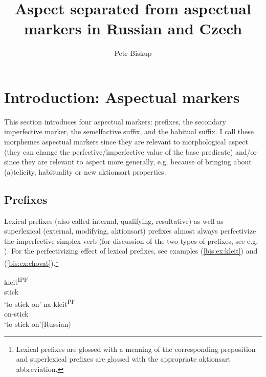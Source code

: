 \documentclass[output=paper]{langscibook}
\author{Petr Biskup\affiliation{Universität Leipzig}\orcid{0000-0003-2602-8856}}
\title{Aspect separated from aspectual markers in Russian and Czech}
\begin{document}
\maketitle

% 

\section{Introduction: Aspectual markers}\label{bis:sec:intro}

This section introduces four aspectual markers: prefixes, the secondary imperfective marker, the semelfactive suffix, and the habitual suffix. I call these morphemes aspectual markers since they are relevant to morphological aspect (they can change the perfective/imperfective value of the base predicate) and/or since they are relevant to aspect more generally, e.g. because of bringing about (a)teli\-city, habituality or new aktionsart properties. 

\subsection{Prefixes}\label{bis:sec:pref}

Lexical prefixes (also called internal, qualifying, resultative) as well as superlexical (external, modifying, aktionsart) prefixes almost always perfectivize the imperfective simplex verb (for discussion of the two types of prefixes, see e.g. \citealt{Isacenko1962,Petr1986,Lehmann1993,Schoorlemmer1995,BabkoMalaya1999,Svenonius2004b,Arsenijevic2006,Romanova2006,Gehrke2008b,Tatevosov2013,Szucsich2014,Biskup.Zybatow2015,Caha.Zikova2016,Biskup2019,KlimekJankowska.Błaszczak2021,KlimekJankowska.Błaszczak2022}). For the perfectivizing effect of lexical prefixes, see examples (\ref{bis:ex:kleit}) and (\ref{bis:ex:chovat}).\footnote{Lexical prefixes are glossed with a meaning of the corresponding preposition and superlexical prefixes are glossed with the appropriate aktionsart abbreviation.}

\ea\label{bis:ex:kleit}
\ea\label{bis:ex:kleitA} \gll kleiť\textsuperscript{IPF} \\ 
stick \\
\glt ‘to stick on’
\ex\label{bis:ex:nakleitB} \gll na-kleiť\textsuperscript{PF} \\  
on-stick \\
\glt ‘to stick on’\hfill (Russian)
\z
\end{document}
